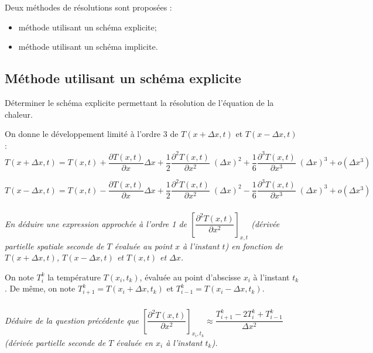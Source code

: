 \noindent
Deux méthodes de résolutions sont proposées : 
\begin{itemize}
\item méthode utilisant un schéma explicite;
\item méthode utilisant un schéma implicite.
\end{itemize}
\fi

\subsection{Méthode utilisant un schéma explicite}

\ifprof
\else
\begin{obj}
Déterminer le schéma explicite permettant la résolution de l'équation de la chaleur.
\end{obj}

On donne le développement limité à l'ordre 3 de $T(x+\Delta x,t)$ et $T(x-\Delta x,t)$ :
$$
T(x+\Delta x,t)=T(x,t)+\dfrac{\partial T(x,t)}{\partial x}\Delta x 
+ \dfrac{1}{2}\dfrac{\partial^2 T(x,t)}{\partial x^2} \;\left( \Delta x\right)^2 
+ \dfrac{1}{6}\dfrac{\partial^3 T(x,t)}{\partial x^3} \;\left( \Delta x\right)^3 
+ o\left( \Delta x^3\right)
$$

$$
T(x-\Delta x,t)=T(x,t)-\dfrac{\partial T(x,t)}{\partial x}\Delta x 
+ \dfrac{1}{2}\dfrac{\partial^2 T(x,t)}{\partial x^2} \;\left( \Delta x\right)^2 
- \dfrac{1}{6}\dfrac{\partial^3 T(x,t)}{\partial x^3}\;\left( \Delta x\right)^3 
+ o\left( \Delta x^3\right)
$$

\subparagraph{}\textit{En déduire une expression approchée à l'ordre 1 de
 $\left[\dfrac{\partial^2 T(x,t)}{\partial x^2}\right]_{x,t}$ (dérivée partielle spatiale seconde de 
 $T$ évaluée au point $x$ à l'instant $t$) en fonction de $T(x+\Delta x,t)$, $T(x-\Delta x,t)$ et 
$T(x,t)$ et $\Delta x$.}



\vspace{.5cm}

On note $T_i^k$ la température $T\left(x_i,t_k\right)$, évaluée au point d'abscisse $x_i$ à
 l'instant $t_k$. De même, on note $T_{i+1}^k=T\left(x_i + \Delta x,t_k \right)$ et 
$T_{i-1}^k=T\left(x_i - \Delta x,t_k \right)$.

\subparagraph{}\textit{Déduire de la question précédente que  
$\left[\dfrac{\partial^2 T(x,t)}{\partial x^2}\right]_{x_i,t_k} \approx
\dfrac{T_{i+1}^k-2T_{i}^k + T_{i-1}^k}{\Delta x^2 } $ (dérivée partielle seconde de 
$T$ évaluée en $x_i$ à l'instant $t_k$).}


